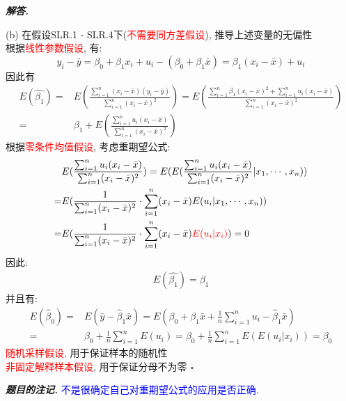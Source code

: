 \documentclass[10pt, a4paper, oneside]{ctexart}
\newenvironment{solution}{%
  \par\noindent\textbf{\textit{解答. }}\ignorespaces
}{%
  \hfill\ensuremath{\square}\par %
}
\newenvironment{note}{\par\noindent\textbf{\textit{题目的注记. }}\ignorespaces}{\par}
\begin{document}
\begin{solution}
(b) 在假设SLR.1 - SLR.4下(\textcolor{red}{不需要同方差假设}), 推导上述变量的无偏性\\
根据\textcolor{red}{线性参数假设}, 有:
$$y_i - \bar{y}= \beta_0+\beta_1 x_i+u_i - (\beta_0 + \beta_1 \bar{x}) = \beta_1 (x_i - \bar{x})+u_i$$
因此有
\begin{align*}
  E(\hat{\beta_1}) = &E(\frac{\sum_{i=1}^n (x_i-\bar{x})(y_i-\bar{y}) }{\sum_{i=1}^n (x_i-\bar{x})^2})= E(\frac{\sum_{i=1}^n \beta_1(x_i-\bar{x})^2+\sum_{i=1}^n u_i(x_i-\bar{x})  }{\sum_{i=1}^n (x_i-\bar{x})^2})\\
  =& \beta_1 + E(\frac{\sum_{i=1}^n u_i(x_i-\bar{x})  }{\sum_{i=1}^n (x_i-\bar{x})^2})
\end{align*}
根据\textcolor{red}{零条件均值假设}, 考虑重期望公式:
\begin{align*}
  &E(\frac{\sum_{i=1}^n u_i(x_i-\bar{x})  }{\sum_{i=1}^n (x_i-\bar{x})^2}) = E(E(\frac{\sum_{i=1}^n u_i(x_i-\bar{x})  }{\sum_{i=1}^n (x_i-\bar{x})^2}| x_1,\cdots,x_n))\\=&E(\frac{1}{\sum_{i=1}^n (x_i-\bar{x})^2}\cdot \sum_{i=1}^n(x_i-\bar{x}) E( u_i  | x_1,\cdots,x_n))\\
  =&E(\frac{1}{\sum_{i=1}^n (x_i-\bar{x})^2}\cdot \sum_{i=1}^n(x_i-\bar{x}) \textcolor{red}{E( u_i  | x_i)})=0
\end{align*}
因此:
\begin{align*}
  E(\hat{\beta_1}) = \beta_1
\end{align*}
并且有:
\begin{align*}
  E(\hat{\beta}_0) =& E(\bar{y} - \hat{\beta}_1 \bar{x}) = E( \beta_0 + \beta_1 \bar{x} + \frac{1}{n}\sum_{i=1}^n u_i -  \hat{\beta}_1 \bar{x})\\
  =&\beta_0  +\frac{1}{n}\sum_{i=1}^nE(   u_i )=\beta_0  +\frac{1}{n}\sum_{i=1}^nE(E(u_i|x_i))=\beta_0
\end{align*}
\textcolor{red}{随机采样假设}, 用于保证样本的随机性\\
\textcolor{red}{非固定解释样本假设}, 用于保证分母不为零
\end{solution}
\begin{note}
\textcolor{blue}{不是很确定自己对重期望公式的应用是否正确.}
\end{note}
\end{document}
